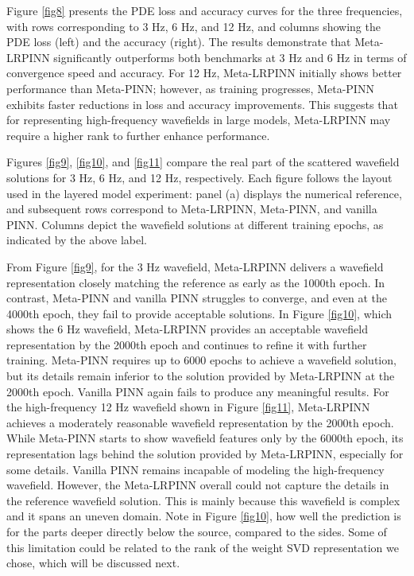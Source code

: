 Figure \ref{fig8} presents the PDE loss and accuracy curves for the three frequencies, with rows corresponding to 3 Hz, 6 Hz, and 12 Hz, and columns showing the PDE loss (left) and the accuracy (right). The results demonstrate that Meta-LRPINN significantly outperforms both benchmarks at 3 Hz and 6 Hz in terms of convergence speed and accuracy. For 12 Hz, Meta-LRPINN initially shows better performance than Meta-PINN; however, as training progresses, Meta-PINN exhibits faster reductions in loss and accuracy improvements. This suggests that for representing high-frequency wavefields in large models, Meta-LRPINN may require a higher rank to further enhance performance. 

Figures \ref{fig9}, \ref{fig10}, and \ref{fig11} compare the real part of the scattered wavefield solutions for 3 Hz, 6 Hz, and 12 Hz, respectively. Each figure follows the layout used in the layered model experiment: panel (a) displays the numerical reference, and subsequent rows correspond to Meta-LRPINN, Meta-PINN, and vanilla PINN. Columns depict the wavefield solutions at different training epochs, as indicated by the above label. 

From Figure \ref{fig9}, for the 3 Hz wavefield, Meta-LRPINN delivers a wavefield representation closely matching the reference as early as the 1000th epoch. In contrast, Meta-PINN and vanilla PINN struggles to converge, and even at the 4000th epoch, they fail to provide acceptable solutions. In Figure  \ref{fig10}, which shows the 6 Hz wavefield, Meta-LRPINN provides an acceptable wavefield representation by the 2000th epoch and continues to refine it with further training. Meta-PINN requires up to 6000 epochs to achieve a wavefield solution, but its details remain inferior to the solution provided by Meta-LRPINN at the 2000th epoch. Vanilla PINN again fails to produce any meaningful results. For the high-frequency 12 Hz wavefield shown in Figure \ref{fig11}, Meta-LRPINN achieves a moderately reasonable wavefield representation by the 2000th epoch. While Meta-PINN starts to show wavefield features only by the 6000th epoch, its representation lags behind the solution provided by Meta-LRPINN, especially for some details. Vanilla PINN remains incapable of modeling the high-frequency wavefield. However, the Meta-LRPINN overall could not capture the details in the reference wavefield solution. This is mainly because this wavefield is complex and it spans an uneven domain. Note in Figure \ref{fig10}, how well the prediction is for the parts deeper directly below the source, compared to the sides. Some of this limitation could be related to the rank of the weight SVD representation we chose, which will be discussed next.


